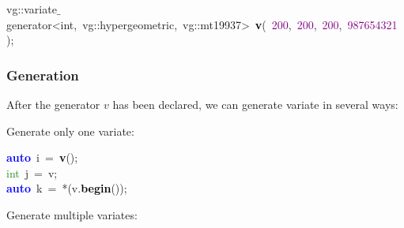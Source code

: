 \noindent
\mbox{}vg\textcolor{BrickRed}{::}\textcolor{TealBlue}{variate$\_$generator\textless{}int,\ vg::hypergeometric,\ vg::mt19937\textgreater{}}\ \textbf{\textcolor{Black}{v}}\textcolor{BrickRed}{(}\ \textcolor{Purple}{200}\textcolor{BrickRed}{,}\ \textcolor{Purple}{200}\textcolor{BrickRed}{,}\ \textcolor{Purple}{200}\textcolor{BrickRed}{,}\ \textcolor{Purple}{987654321}\ \textcolor{BrickRed}{);} \\
\mbox{}

\subsubsection{Generation}

After the generator $v$ has been declared, we can generate variate in several ways:


                        Generate only one variate: 

                        \noindent
                        \mbox{}\textbf{\textcolor{Blue}{auto}}\ i\ \textcolor{BrickRed}{=}\ \textbf{\textcolor{Black}{v}}\textcolor{BrickRed}{();} \\
                        \mbox{}\textcolor{ForestGreen}{int}\ j\ \textcolor{BrickRed}{=}\ v\textcolor{BrickRed}{;} \\
                        \mbox{}\textbf{\textcolor{Blue}{auto}}\ k\ \textcolor{BrickRed}{=}\ \textcolor{BrickRed}{*(}v\textcolor{BrickRed}{.}\textbf{\textcolor{Black}{begin}}\textcolor{BrickRed}{());} \\
                        \mbox{}

                        Generate multiple variates: 

